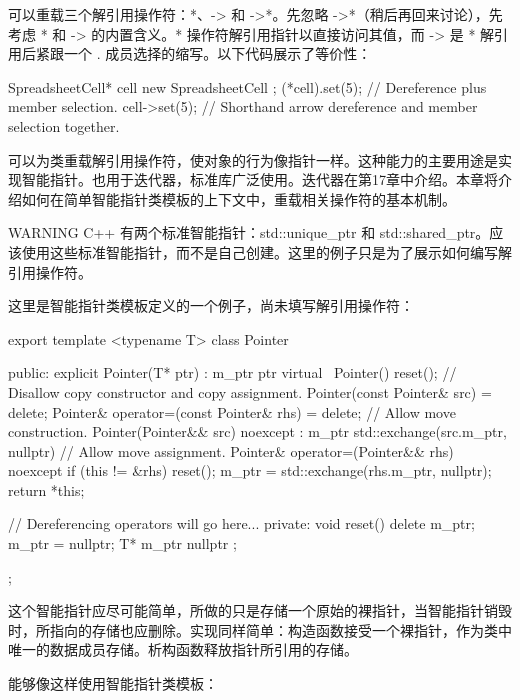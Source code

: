 
可以重载三个解引用操作符：*、-> 和 ->*。先忽略 ->*（稍后再回来讨论），先考虑 * 和 -> 的内置含义。* 操作符解引用指针以直接访问其值，而 -> 是 * 解引用后紧跟一个 . 成员选择的缩写。以下代码展示了等价性：

\begin{cpp}
SpreadsheetCell* cell { new SpreadsheetCell };
(*cell).set(5); // Dereference plus member selection.
cell->set(5); // Shorthand arrow dereference and member selection together.
\end{cpp}

可以为类重载解引用操作符，使对象的行为像指针一样。这种能力的主要用途是实现智能指针。也用于迭代器，标准库广泛使用。迭代器在第17章中介绍。本章将介绍如何在简单智能指针类模板的上下文中，重载相关操作符的基本机制。

\begin{myWarning}{WARNING}
C++ 有两个标准智能指针：std::unique\_ptr 和 std::shared\_ptr。应该使用这些标准智能指针，而不是自己创建。这里的例子只是为了展示如何编写解引用操作符。
\end{myWarning}

这里是智能指针类模板定义的一个例子，尚未填写解引用操作符：

\begin{cpp}
export template <typename T> class Pointer
{
    public:
        explicit Pointer(T* ptr) : m_ptr { ptr } {}
        virtual ~Pointer() { reset(); }
        // Disallow copy constructor and copy assignment.
        Pointer(const Pointer& src) = delete;
        Pointer& operator=(const Pointer& rhs) = delete;
        // Allow move construction.
        Pointer(Pointer&& src) noexcept : m_ptr{ std::exchange(src.m_ptr, nullptr)}
        { }
        // Allow move assignment.
        Pointer& operator=(Pointer&& rhs) noexcept
        {
            if (this != &rhs) {
                reset();
                m_ptr = std::exchange(rhs.m_ptr, nullptr);
            }
            return *this;
        }

        // Dereferencing operators will go here...
    private:
        void reset()
        {
            delete m_ptr;
            m_ptr = nullptr;
        }
        T* m_ptr { nullptr };
};
\end{cpp}

这个智能指针应尽可能简单，所做的只是存储一个原始的裸指针，当智能指针销毁时，所指向的存储也应删除。实现同样简单：构造函数接受一个裸指针，作为类中唯一的数据成员存储。析构函数释放指针所引用的存储。

能够像这样使用智能指针类模板：

